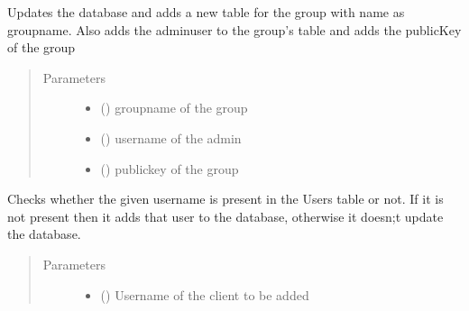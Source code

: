 \documentclass[letterpaper,10pt,english]{sphinxmanual}
\begin{document}
\begin{fulllineitems}
\begin{fulllineitems}
\label{\detokenize{sql:sql.Database.create_group_database}}
Updates the database and adds a new table for the group with name as groupname.
Also adds the adminuser to the group’s table and adds the publicKey of the group
\begin{quote}\begin{description}
\item[{Parameters}] \leavevmode\begin{itemize}
\item {} 
 () \textendash{} groupname of the group

\item {} 
 () \textendash{} username of the admin

\item {} 
 () \textendash{} publickey of the group

\end{itemize}

\end{description}\end{quote}

\end{fulllineitems}


\begin{fulllineitems}
\label{\detokenize{sql:sql.Database.create_user}}
Checks whether the given username is present in the Users table or not. If it is not present then it adds that user to the database, otherwise it doesn;t update the database.
\begin{quote}\begin{description}
\item[{Parameters}] \leavevmode\begin{itemize}
\item {} 
 () \textendash{} Username of the client to be added


\end{itemize}
\end{description}
\end{quote}
\end{fulllineitems}
\end{fulllineitems}
\end{document}
